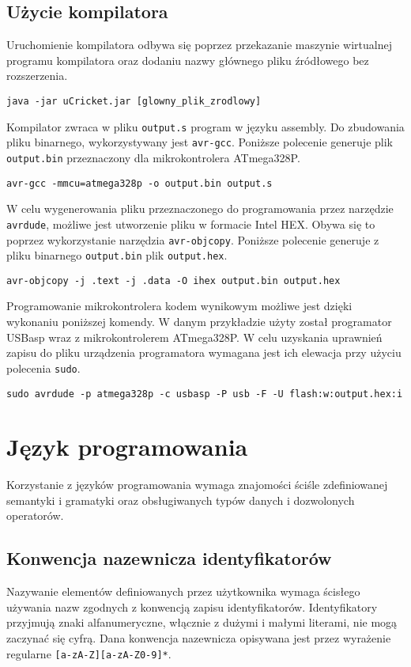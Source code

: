 \subsection{Użycie kompilatora}
Uruchomienie kompilatora odbywa się poprzez przekazanie maszynie wirtualnej programu kompilatora oraz dodaniu nazwy głównego pliku źródłowego bez rozszerzenia.
\begin{lstlisting}
java -jar uCricket.jar [glowny_plik_zrodlowy]
\end{lstlisting}
Kompilator zwraca w pliku \lstinline|output.s| program w języku assembly. Do zbudowania pliku binarnego, wykorzystywany jest \lstinline|avr-gcc|. Poniższe polecenie generuje plik \lstinline|output.bin| przeznaczony dla mikrokontrolera ATmega328P.
\begin{lstlisting}
avr-gcc -mmcu=atmega328p -o output.bin output.s
\end{lstlisting}
W celu wygenerowania pliku przeznaczonego do programowania przez narzędzie \lstinline|avrdude|, możliwe jest utworzenie pliku w formacie Intel HEX. Obywa się to poprzez wykorzystanie narzędzia \lstinline|avr-objcopy|. Poniższe polecenie generuje z pliku binarnego \lstinline|output.bin| plik \lstinline|output.hex|.
\begin{lstlisting}
avr-objcopy -j .text -j .data -O ihex output.bin output.hex
\end{lstlisting}
Programowanie mikrokontrolera kodem wynikowym możliwe jest dzięki wykonaniu poniższej komendy. W danym przykładzie użyty został programator USBasp wraz z mikrokontrolerem ATmega328P. W celu uzyskania uprawnień zapisu do pliku urządzenia programatora wymagana jest ich elewacja przy użyciu polecenia \lstinline|sudo|.
\begin{lstlisting}
sudo avrdude -p atmega328p -c usbasp -P usb -F -U flash:w:output.hex:i
\end{lstlisting}

\section{Język programowania}
Korzystanie z języków programowania wymaga znajomości ściśle zdefiniowanej semantyki i gramatyki oraz obsługiwanych typów danych i dozwolonych operatorów.
\subsection{Konwencja nazewnicza identyfikatorów}
Nazywanie elementów definiowanych przez użytkownika wymaga ścisłego używania nazw zgodnych z konwencją zapisu identyfikatorów. Identyfikatory przyjmują znaki alfanumeryczne, włącznie z dużymi i małymi literami, nie mogą zaczynać się cyfrą. Dana konwencja nazewnicza opisywana jest przez wyrażenie regularne \lstinline|[a-zA-Z][a-zA-Z0-9]*|.

